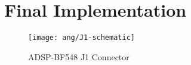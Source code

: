 
\section{Final Implementation}

\begin{figure}[H]
\centering
\texttt{[image: ang/J1-schematic]}
\caption{ADSP-BF548 J1 Connector \cite{bf548-manual}}
\label{J1-schematic}
\end{figure}
